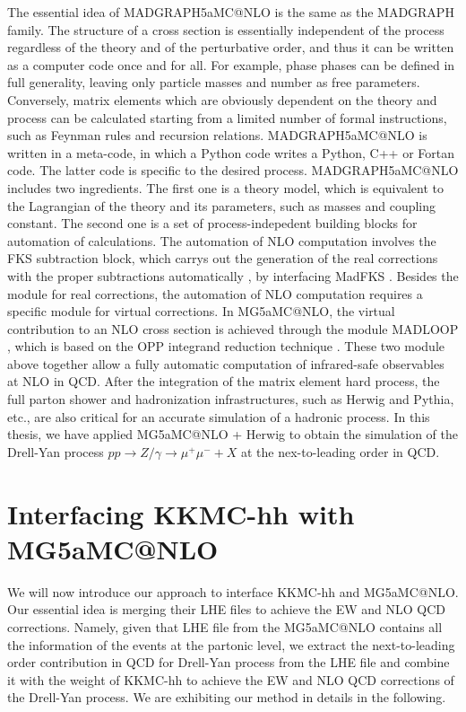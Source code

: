  The essential idea of MADGRAPH5\textunderscore aMC@NLO is the same as the MADGRAPH family. The structure of a cross section is essentially independent of the process regardless of the theory and of the perturbative order, and thus it can be written as a computer code once and for all. For example, phase phases can be defined in full generality, leaving only particle masses and number as free parameters. Conversely, matrix elements which are obviously dependent on the theory and process can be calculated starting from a limited number of formal instructions, such as Feynman rules and recursion relations. 
 MADGRAPH5\textunderscore aMC@NLO is written in a meta-code, in which a Python code writes a Python, C++ or Fortan code. The latter code is specific to the desired process. MADGRAPH5\textunderscore aMC@NLO includes two ingredients. The first one is a theory model, which is equivalent to the Lagrangian of the theory and its parameters, such as masses and coupling constant. The second one is a set of process-indepedent building blocks for automation of calculations. The automation of NLO computation  
 involves the FKS subtraction block, which carrys out the generation of the real corrections with the proper subtractions automatically \cite{fks1,fks2,fks3,fks4,fks5,fks6}, by interfacing MadFKS \cite{fks6}. Besides the module for real corrections, the automation of NLO computation requires a specific module for virtual corrections. In MG5\textunderscore aMC@NLO, the virtual contribution to an NLO cross section is achieved through the module MADLOOP \cite{madloop}, which is based on the OPP integrand reduction technique \cite{opp}. These two module above together allow a fully automatic computation of infrared-safe observables at NLO in QCD. After the integration of the matrix element hard process,  the full parton shower and hadronization infrastructures, such as Herwig and Pythia, etc., are also critical for an accurate simulation of a hadronic process. In this thesis, we have applied MG5\textunderscore aMC@NLO + Herwig to obtain the simulation of the Drell-Yan process $pp\to Z/\gamma\to \mu^+\mu^-+X$ at the nex-to-leading order in QCD.
 
\newpage 
 \section{Interfacing KKMC-hh with MG5\textunderscore aMC@NLO}
We will now introduce our approach to interface KKMC-hh and MG5\textunderscore aMC@NLO. Our essential idea is 
merging their LHE \cite{LHE} files to achieve the EW and NLO QCD corrections. Namely, given that LHE file from the MG5\textunderscore aMC@NLO contains all the information of the events at the partonic level, we extract the next-to-leading order contribution in QCD for Drell-Yan process from the LHE file and combine it with the weight of KKMC-hh to achieve the EW and NLO QCD corrections of the Drell-Yan process. We are exhibiting our method in details in the following.
 

